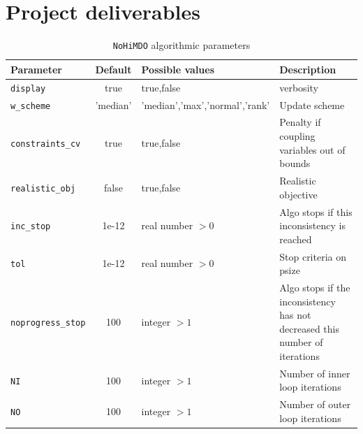 \documentclass[11pt]{article}
\begin{document}
\newpage
\section*{Project deliverables} \label{sec:intro}

\begin{table}[h!]
  \centering
  \renewcommand{\arraystretch}{1.2}%
  \small\addtolength{\tabcolsep}{1pt}
  \caption{\texttt{NoHiMDO} algorithmic parameters}
  \label{table:algoparameters}
  \begin{tabular}{lc>{\centering\arraybackslash}p{5.5cm}>{\centering\arraybackslash}p{6cm}}
    \hline\hline
    \bf Parameter               & \bf Default & \bf Possible values               & \bf Description                                                               \\ \hline
    \texttt{display}            & true        & true,false                        & verbosity                                                                     \\
    \texttt{w\_scheme}          & 'median'    & 'median','max','normal','rank'    & Update scheme                                                                 \\
    \texttt{constraints\_cv}    & true				& true,false				                & Penalty if coupling variables out of bounds                                   \\
    \texttt{realistic\_obj}     & false				& true,false				                & Realistic objective                                                           \\
    \texttt{inc\_stop}          & 1e-12				&	real number $> 0$			            & Algo stops if this inconsistency is reached                                   \\
    \texttt{tol}                & 1e-12			  & real number $> 0$			            & Stop criteria on psize                                                        \\
    \texttt{noprogress\_stop}   & 100		 			& integer $> 1$		 			            & Algo stops if the inconsistency has not decreased this number of iterations   \\
    \texttt{NI}                 & 100         & integer $> 1$                     & Number of inner loop iterations                                               \\
    \texttt{NO}                 & 100         & integer $> 1$                     & Number of outer loop iterations                                               \\

\end{tabular}
\end{table}
\end{document}

